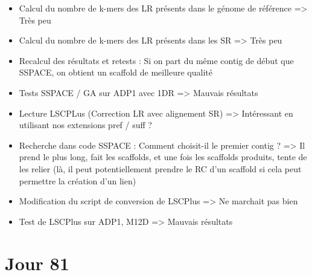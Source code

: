\documentclass[12pt]{report}
\begin{document}
\begin{itemize}
	\item Calcul du nombre de k-mers des LR présents dans le génome de référence => Très peu
	
	\item Calcul du nombre de k-mers des LR présents dans les SR => Très peu
	
	\item Recalcul des résultats et retests : Si on part du même contig de début que SSPACE, on obtient un scaffold de meilleure qualité
	
	\item Tests SSPACE / GA sur ADP1 avec 1DR => Mauvais résultats
	
	\item Lecture LSCPLus (Correction LR avec alignement SR) => Intéressant en utilisant nos extensions pref / suff ?
	
	\item Recherche dans code SSPACE : Comment choisit-il le premier contig ? => Il prend le plus long, fait les scaffolds,
		  et une fois les scaffolds produits, tente de les relier (là, il peut potentiellement prendre le RC d'un scaffold
		  si cela peut permettre la création d'un lien)
		  
	\item Modification du script de conversion de LSCPlus => Ne marchait pas bien
		  
	\item Test de LSCPlus sur ADP1, M12D => Mauvais résultats
\end{itemize}

\section{Jour 81}
\end{document}
